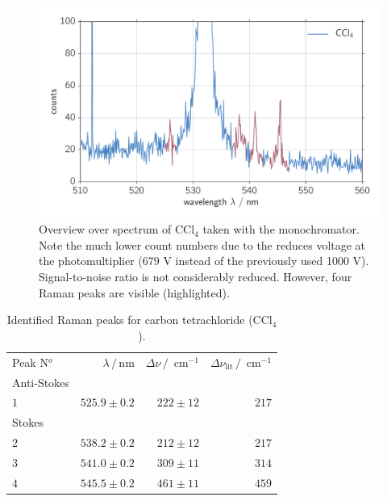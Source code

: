 \begin{figure}[htpb]
    \centering
    \includegraphics[width=0.8\linewidth]{analysis/figures/mono_ccl4}
    \caption{Overview over spectrum of CCl$_4$ taken with the monochromator. Note the much lower count numbers due to 
    the reduces voltage at the photomultiplier (679 V instead of the previously used 1000 V). Signal-to-noise ratio is 
    not considerably reduced. However, four Raman peaks are visible (highlighted). }
    \label{fig:mono_ccl4}
\end{figure}

\begin{table}[htpb]
    \centering
    \caption{
        Identified Raman peaks for carbon tetrachloride (CCl$_4$). 
        }
    \label{tab:mono_ccl4}
    \begin{tabular}{l r r r}
        \rowcolor{LightCyan} Peak N$^o$ & $\lambda \, / \, \text{nm}$ &
        $\Delta \nu \, / \, \text{ cm}^{-1}$ & 
        $\Delta \nu_\text{lit} \, / \, \text{ cm}^{-1}$ \\
        \cellcolor{LightCyan}Anti-Stokes& && \\
        \cellcolor{LightCyan}$1$ & $525.9 \pm 0.2$ & $222 \pm 12$ & $217$   \\
        \cellcolor{LightCyan}Stokes& && \\
        \cellcolor{LightCyan}$2$ & $538.2 \pm 0.2$ & $212 \pm 12$ & $217$   \\
        \cellcolor{LightCyan}$3$ & $541.0 \pm 0.2$ & $309 \pm 11$ & $314$   \\
        \cellcolor{LightCyan}$4$ & $545.5 \pm 0.2$ & $461 \pm 11$ & $459$ 
    \end{tabular}
\end{table}




